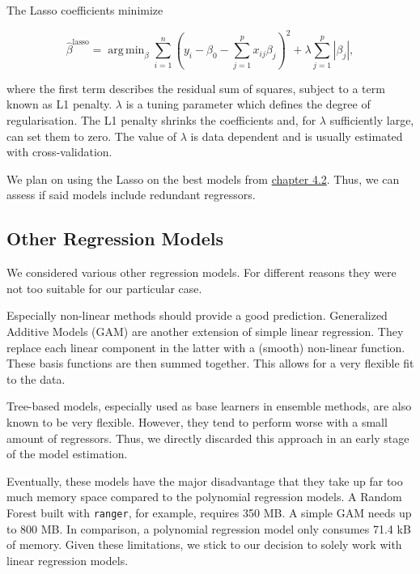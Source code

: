 \documentclass[12pt,a4paper]{article}
\DeclareMathOperator*{\argmin}{arg\,min}
\begin{document}
The \ac{Lasso} coefficients minimize

\begin{equation}
    \hat{\beta}^{\text{lasso}} = \argmin_{\beta} \sum^n_{i=1} \left( y_i - \beta_0 - \sum^p_{j=1} x_{ij} \beta_j \right)^2 + 
    \lambda \sum^p_{j=1} |\beta_j |,
\label{eq:9}
\end{equation}

where the first term describes the residual sum of squares, subject to a
term known as L1 penalty. \(\lambda\) is a tuning parameter which
defines the degree of regularisation. The L1 penalty shrinks the
coefficients and, for \(\lambda\) sufficiently large, can set them to
zero. The value of \(\lambda\) is data dependent and is usually
estimated with cross-validation. \autocite{James_2013}

We plan on using the \ac{Lasso} on the best models from
\protect\hyperlink{polynomial-regression}{chapter 4.2}. Thus, we can
assess if said models include redundant regressors.

\hypertarget{other-regression-models}{%
\subsection{Other Regression Models}\label{other-regression-models}}

We considered various other regression models. For different reasons
they were not too suitable for our particular case.

Especially non-linear methods should provide a good prediction.
Generalized Additive Models (GAM) are another extension of simple linear
regression. They replace each linear component in the latter with a
(smooth) non-linear function. These basis functions are then summed
together. This allows for a very flexible fit to the data.
\autocite{James_2013}

Tree-based models, especially used as base learners in ensemble methods,
are also known to be very flexible. However, they tend to perform worse
with a small amount of regressors. Thus, we directly discarded this
approach in an early stage of the model estimation.

Eventually, these models have the major disadvantage that they take up
far too much memory space compared to the polynomial regression models.
A Random Forest built with \texttt{ranger}, for example, requires 350
MB. A simple GAM needs up to 800 MB. In comparison, a polynomial
regression model only consumes 71.4 kB of memory. Given these
limitations, we stick to our decision to solely work with linear
regression models.
\end{document}
